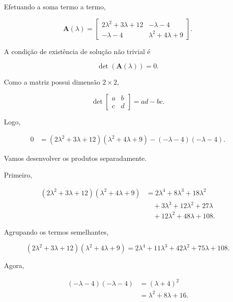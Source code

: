\documentclass[12pt,a4paper]{article}
\begin{document}
Efetuando a soma termo a termo,

\begin{equation}
\mathbf{A}(\lambda)
=
\begin{bmatrix}
2\lambda^2+3\lambda+12
&
-\lambda-4\\
-\lambda-4
&
\lambda^2+4\lambda+9
\end{bmatrix}.
\end{equation}

A condição de existência de solução não trivial é

\begin{equation}
\det\left(\mathbf{A}(\lambda)\right)=0.
\end{equation}

Como a matriz possui dimensão $2\times2$,

\begin{equation}
\det
\begin{bmatrix}
a & b\\
c & d
\end{bmatrix}
=ad-bc.
\end{equation}

Logo,

\begin{align}
0
&=
(2\lambda^2+3\lambda+12)
(\lambda^2+4\lambda+9)
-
(-\lambda-4)(-\lambda-4).
\end{align}

Vamos desenvolver os produtos separadamente.

Primeiro,

\begin{align}
(2\lambda^2+3\lambda+12)
(\lambda^2+4\lambda+9)
&=
2\lambda^4
+8\lambda^3
+18\lambda^2\\
&\quad
+3\lambda^3
+12\lambda^2
+27\lambda\\
&\quad
+12\lambda^2
+48\lambda
+108.
\end{align}

Agrupando os termos semelhantes,

\begin{equation}
(2\lambda^2+3\lambda+12)
(\lambda^2+4\lambda+9)
=
2\lambda^4
+11\lambda^3
+42\lambda^2
+75\lambda
+108.
\end{equation}

Agora,

\begin{align}
(-\lambda-4)(-\lambda-4)
&=(\lambda+4)^2\\
&=\lambda^2+8\lambda+16.
\end{align}
\end{document}
